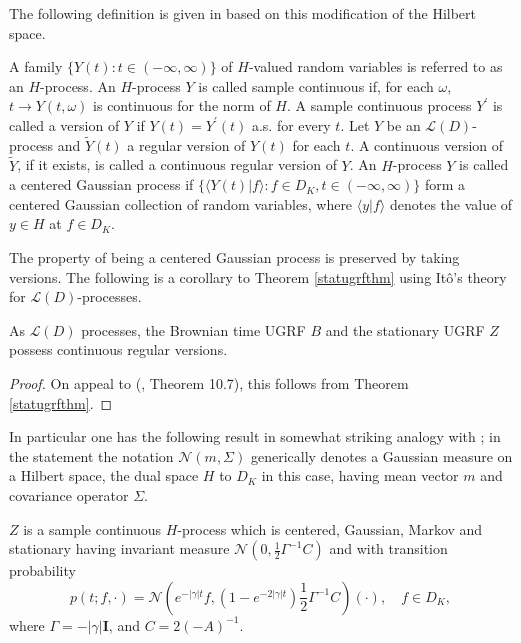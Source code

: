 \documentclass[11pt]{article}
\numberwithin{equation}{section}
\theoremstyle{definition}
\theoremstyle{remark}
\theoremstyle{definition}
\begin{document}
The following definition is given in \cite{ito} based on
this modification of the Hilbert space. 
\begin{defin}\label{contregdef}
 A family $\{Y(t):t\in(-\infty,\infty)\}$
 of  $H$-valued random variables is referred to
as an $H$-process. 
An $H$-process $Y$ is called
sample continuous if, for each $\omega$,
 $t\to Y(t,\omega)$ is continuous 
for the norm of $H$.  A sample continuous process
$Y^\prime$ is called a version of $Y$ if $Y(t)=Y^\prime(t)$
a.s. for every  $t$. Let $Y$ be an $\mathcal{L}(D)$-process
and $\tilde{Y}(t)$ a regular version of $Y(t)$ for each $t$.
A continuous version of $\tilde{Y}$, if it exists, is called
a continuous regular version of $Y$.
An $H$-process $Y$ is called a centered Gaussian
process if $\{\langle Y(t)|f\rangle: f\in D_K, t\in(-\infty,\infty)\}$
form a centered Gaussian collection of random variables,
where  $\langle y|f\rangle$ denotes the
value of $y\in H$ at $f\in D_K$.
\end{defin}
The property of being a centered Gaussian process is
preserved by taking versions. 
The following is a corollary to Theorem \ref{statugrfthm}
using It\^o's theory for $\mathcal{L}(D)$-processes. 
\begin{cor}\label{contregcor}
As $\mathcal{L}(D)$ processes,
the Brownian time UGRF $B$  and the
stationary UGRF $Z$ possess continuous regular 
versions.
\end{cor}
\begin{proof}
On appeal to (\cite{ito}, Theorem 10.7), this follows from Theorem \ref{statugrfthm}.
\end{proof}
In particular 
 one has the following result
  in somewhat striking analogy with \cite{albeveriokus};
in the statement  the notation
 $\mathcal{N}(m,\Sigma)$ generically denotes
a Gaussian measure on a Hilbert space, the
dual space $H$ to ${D}_K$
in this case,  having
 mean vector $m$
and covariance operator $\Sigma$.
\begin{cor}\label{riggedZcor}
$Z$ is a sample continuous $H$-process which is
centered, Gaussian, Markov and stationary 
having invariant measure $\mathcal{N}(0,\frac{1}{2}\Gamma^{-1}C)$
and with transition probability 
\begin{equation}
p(t;f,\cdot) = \mathcal{N}(e^{-|\gamma| t}f,
(1-e^{-2|\gamma|t})\frac{1}{2}\Gamma^{-1}C)(\cdot),\quad
f\in D_K,
\end{equation}
where $\Gamma =-|\gamma|{\mathbf I}$, and
$C= 2(-A)^{-1}$. 
\end{cor}
\end{document}
